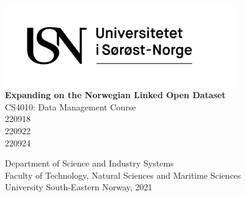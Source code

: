\thispagestyle{empty}

\begin{center}

\includegraphics[width=10cm]{figures/logos/USN_logo_rgb.png}\\[5pc]

\textbf{\Huge{Expanding on the Norwegian Linked Open Dataset}}\\[0.1pc]

\small{CS4010: Data Management Course}\\[7pc]

\Large{220918}\\
\Large{220922}\\
\Large{220924}\\

\vfill

\large{Department of Science and Industry Systems}\\[1pc]
\large{Faculty of Technology, Natural Sciences and Maritime Sciences}\\[1pc]
\large{University South-Eastern Norway, 2021}\\[1pc]

\end{center}
